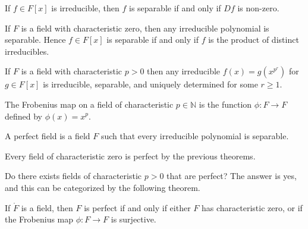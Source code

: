 \documentclass{article}                                                        %
\begin{document}
            \begin{theorem}
                If $f\in{F}[x]$ is irreducible, then $f$ is separable if and
                only if $Df$ is non-zero.
            \end{theorem}
            \begin{theorem}
                If $F$ is a field with characteristic zero, then any irreducible
                polynomial is separable. Hence $f\in{F}[x]$ is separable if and
                only if $f$ is the product of distinct irreducibles.
            \end{theorem}
            \begin{theorem}
                If $F$ is a field with characteristic $p>0$ then any irreducible
                $f(x)=g(x^{p^{r}})$ for $g\in{F}[x]$ is irreducible, separable,
                and uniquely determined for some $r\geq{1}$.
            \end{theorem}
            \begin{definition}
                The Frobenius map on a field of characteristic $p\in\mathbb{N}$
                is the function $\phi:F\rightarrow{F}$ defined by
                $\phi(x)=x^{p}$.
            \end{definition}
            \begin{definition}
                A perfect field is a field $F$ such that every irreducible
                polynomial is separable.
            \end{definition}
            \begin{example}
                Every field of characteristic zero is perfect by the previous
                theorems.
            \end{example}
            Do there exists fields of characteristic $p>0$ that are perfect?
            The answer is yes, and this can be categorized by the following
            theorem.
            \begin{theorem}
                If $\ring{F}$ is a field, then $F$ is perfect if and only if
                either $F$ has characteristic zero, or if the Frobenius
                map $\phi:F\rightarrow{F}$ is surjective.
            \end{theorem}
\end{document}
